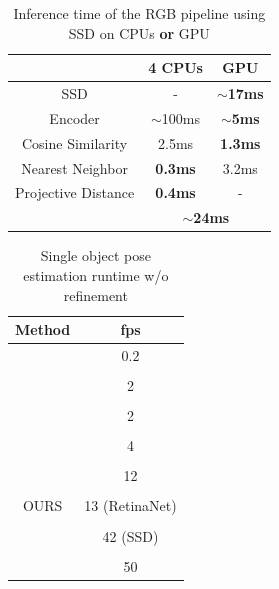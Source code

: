 \begin{table}[t]
		\scriptsize
		\centering
		\captionsetup{width=0.8\columnwidth}
		\caption{Inference time of the RGB pipeline using SSD on CPUs \textbf{or} GPU}
		\begin{tabular}{ccc}
			\toprule
			& 4 CPUs & GPU\\
			\midrule
			SSD & - & \textbf{$\sim$17ms}\\
			Encoder & $\sim$100ms & \textbf{$\sim$5ms}\\
			Cosine Similarity & 2.5ms & \textbf{1.3ms}\\
			Nearest Neighbor &	\textbf{0.3ms} &	3.2ms\\
			Projective Distance &	\textbf{0.4ms} &	-\\
			\midrule
			&\multicolumn{2}{c}{\textbf{$\sim$24ms}}\\
		\end{tabular}
		\label{tab:infer}
\end{table}
\begin{table}[t]
		\centering
		\scriptsize
		\captionsetup{width=0.8\columnwidth}
		\caption{Single object pose estimation runtime w/o refinement}
		\begin{tabular}{cc}
			\toprule
			Method & fps \\
			\midrule
			\cite{vidal20186d} & $0.2$\\
				\\[-0.6em]
			\cite{brachmann2016uncertainty} & 2 \\
			\\[-0.6em]
			\cite{kehl2016deep} & 2 \\
			\\[-0.6em]
			\cite{rad2017bb8} & 4 \\
			\\[-0.6em]
			\cite{kehl2017ssd} & 12 \\
			\\[-0.6em]
			OURS & 13 (RetinaNet) \\
			\\[-0.6em]
				&  42 (SSD) \\
			\\[-0.6em]
			\cite{tekin2017real} & 50 \\
		\end{tabular}
		\label{tab:runtime_compare}
		

\end{table}


